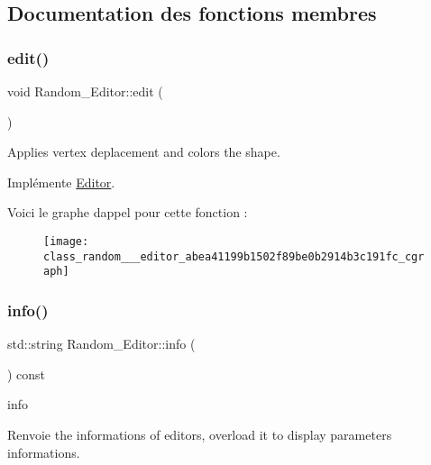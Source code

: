 \subsection{Documentation des fonctions membres}
\mbox{\label{class_random___editor_abea41199b1502f89be0b2914b3c191fc}} 
\subsubsection{\texorpdfstring{edit()}{edit()}}
{\footnotesize\ttfamily void Random\+\_\+\+Editor\+::edit (\begin{DoxyParamCaption}{ }\end{DoxyParamCaption})\hspace{0.3cm}{\ttfamily [virtual]}}



Applies vertex deplacement and colors the shape. 



Implémente \hyperlink{class_editor_abca97ba11536c494a0c26bac77917792}{Editor}.

Voici le graphe d\textquotesingle{}appel pour cette fonction \+:\nopagebreak
\begin{figure}[H]
\begin{center}
\leavevmode
\texttt{[image: class\_random\_\_\_editor\_abea41199b1502f89be0b2914b3c191fc\_cgraph]}
\end{center}
\end{figure}
\mbox{\label{class_random___editor_aa194991b2926aeab96ad5470f549f087}} 
\subsubsection{\texorpdfstring{info()}{info()}}
{\footnotesize\ttfamily std\+::string Random\+\_\+\+Editor\+::info (\begin{DoxyParamCaption}{ }\end{DoxyParamCaption}) const\hspace{0.3cm}{\ttfamily [virtual]}}



info 

\begin{DoxyReturn}{Renvoie}
the informations of editors, overload it to display parameters informations. 
\end{DoxyReturn}


